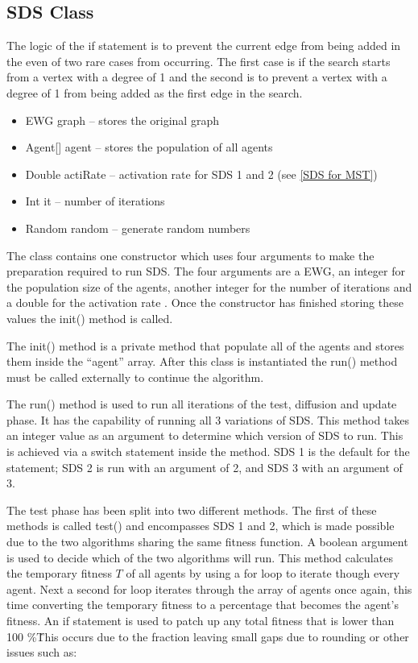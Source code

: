\documentclass{AISB2008}
\begin{document}
{\subsection{SDS Class}

The logic of the if statement is to prevent the current edge from being added in the even of two rare cases from occurring. The first case is if the search starts from a vertex with a degree of 1 and the second is to prevent a vertex with a degree of 1 from being added as the first edge in the search.

\begin{itemize}
\item EWG graph – stores the original graph
\item Agent[] agent – stores the population of all agents
\item Double actiRate – activation rate for SDS 1 and 2 (see \ref{SDS for MST})
\item Int it – number of iterations
\item Random random – generate random numbers
\end{itemize}

The class contains one constructor which uses four arguments to make the preparation required to run SDS. The four arguments are a EWG, an integer for the population size of the agents, another integer for the number of iterations and a double for the activation rate . Once the constructor has finished storing these values the init() method is called.

The init() method is a private method that populate all of the agents and stores them inside the “agent” array. After this class is instantiated the run() method must be called externally to continue the algorithm.

The run() method is used to run all iterations of the test, diffusion and update phase. It has the capability of running all 3 variations of SDS. This method takes an integer value as an argument to determine which version of SDS to run. This is achieved via a switch statement inside the method. SDS 1 is the default for the statement; SDS 2 is run with an argument of 2, and SDS 3 with an argument of 3.

The test phase has been split into two different methods.  The first of these methods is called test() and encompasses SDS 1 and 2, which is made possible due to the two algorithms sharing the same fitness function.  A boolean argument is used to decide which of the two algorithms will run. This method calculates the temporary fitness {$T$} of all agents by using a for loop to iterate though every agent. Next a second for loop iterates through the array of agents once again, this time converting the temporary fitness to a percentage that becomes the agent’s fitness. An if statement is used to patch up any total fitness that is lower than 100 \%\. This occurs due to the fraction leaving small gaps due to rounding or other issues such as:

}
\end{document}
